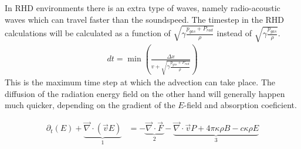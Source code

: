 In RHD environments there is an extra type of waves, namely radio-acoustic waves which can travel faster than the soundspeed. The timestep in the RHD calculations will be calculated as a function of $\sqrt{\gamma\frac{p_{gas} + P_{rad}}{\rho}}$ instead of $\sqrt{\gamma\frac{p_{gas}}{\rho}}$.
\begin{align}
dt = \min \left(\frac{\Delta x}{v + \sqrt{\gamma\frac{p_{gas} + P_{rad}}{\rho}}} \right)
\end{align}
This is the maximum time step at which the advection can take place. The diffusion of the radiation energy field on the other hand will generally happen much quicker, depending on the gradient of the $E$-field and absorption coeficient.

\begin{align}
\partial_t \left(E \right) + \underbrace{\vec{\nabla} \cdot \left( \vec{v} E \right)}_{1}  &= - \underbrace{\vec{\nabla} \cdot \vec{F}}_{2} - \underbrace{\vec{\nabla} \cdot \vec{v} P + 4\pi \kappa\rho B - c \kappa \rho E}_{3} \\
\end{align} 

